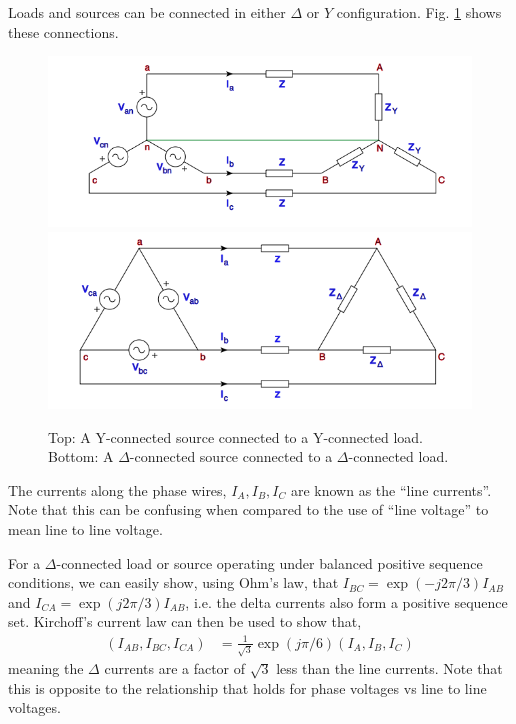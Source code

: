 \documentclass[11pt]{article}
\begin{document}
Loads and sources can be connected in either $\Delta$ or $Y$ configuration. Fig. \ref{FIG_YY_DD} shows these connections.
\begin{figure}[!h]
	\begin{center}
		\includegraphics[width=(12cm)]{YSrcYLd.png}
		\includegraphics[width=(12cm)]{DSrcDLd.png}
	\end{center}
	\caption{
		Top: A Y-connected source connected to a Y-connected load. Bottom: A $\Delta$-connected source connected to a $\Delta$-connected load.
	}
	\label{FIG_YY_DD}
\end{figure}

The currents along the phase wires, $I_A, I_B, I_C$ are known as the ``line currents''. Note that this can be confusing when compared to the use of ``line voltage'' to mean line to line voltage.

For a $\Delta$-connected load or source operating under balanced positive sequence conditions, we can easily show, using Ohm's law, that $I_{BC} = \exp(-j2\pi/3) I_{AB}$ and $I_{CA} = \exp(j2\pi/3) I_{AB}$, i.e. the delta currents also form a positive sequence set. Kirchoff's current law can then be used to show that,
\begin{align}
(I_{AB}, I_{BC}, I_{CA}) &= \frac{1}{\sqrt{3}}\exp\left(j\pi/6\right)(I_A, I_B, I_C)
\end{align}
meaning the $\Delta$ currents are a factor of $\sqrt{3}$ less than the line currents. Note that this is opposite to the relationship that holds for phase voltages vs line to line voltages.
\end{document}
